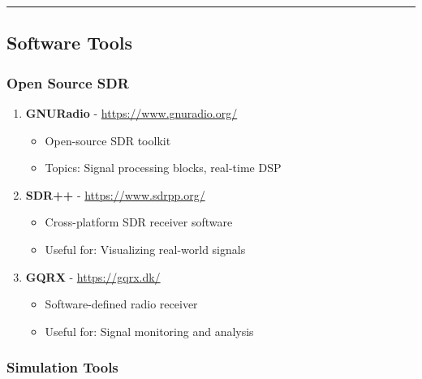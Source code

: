\begin{center}\rule{0.5\linewidth}{0.5pt}\end{center}

\subsection{\texorpdfstring{Software Tools}{Software Tools}}\label{software-tools}

\subsubsection{Open Source SDR}\label{open-source-sdr}

\begin{enumerate}
\def\labelenumi{\arabic{enumi}.}
\setcounter{enumi}{48}
\tightlist
\item
  \textbf{GNURadio} - \url{https://www.gnuradio.org/}

  \begin{itemize}
  \tightlist
  \item
    Open-source SDR toolkit
  \item
    Topics: Signal processing blocks, real-time DSP
  \end{itemize}
\item
  \textbf{SDR++} - \url{https://www.sdrpp.org/}

  \begin{itemize}
  \tightlist
  \item
    Cross-platform SDR receiver software
  \item
    Useful for: Visualizing real-world signals
  \end{itemize}
\item
  \textbf{GQRX} - \url{https://gqrx.dk/}

  \begin{itemize}
  \tightlist
  \item
    Software-defined radio receiver
  \item
    Useful for: Signal monitoring and analysis
  \end{itemize}
\end{enumerate}

\subsubsection{Simulation Tools}\label{simulation-tools}

